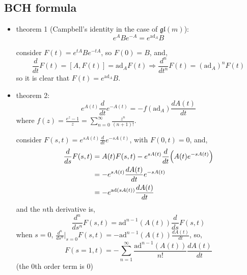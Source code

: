 \subsection{BCH formula}
\begin{itemize}
	\item theorem 1 (Campbell’s identity in the case of $\mathfrak{gl}(m)$):
	\begin{equation}
		e^A B e^{- A} = e^{\mathrm{ad}_A} B
	\end{equation}
	
	\begin{tcolorbox}[title=proof:]
		consider $F(t) = e^{t A} B e^{- t A}$, so $F(0) = B$, and,
		\begin{equation}
			\frac{d}{dt} F(t) = [A, F(t)] = \mathrm{ad}_A F(t) \Longrightarrow \frac{d^n}{dt^n} F(t) = (\mathrm{ad}_A)^n F(t)
		\end{equation}
		so it is clear that $F(t) = e^{\mathrm{ad}_A} B$.
	\end{tcolorbox}
	
	\item theorem 2:
	\begin{equation}
		e^{A(t)} \frac{d}{dt} e^{- A(t)} = - f(\mathrm{ad}_A) \frac{d A(t)}{dt}
	\end{equation}
	where $f(z) = \frac{e^z - 1}{z} = \sum_{n = 0}^\infty \frac{z^n}{(n + 1)!}$.
	
	\begin{tcolorbox}[title=proof:]
		consider $F(s, t) = e^{s A(t)} \frac{d}{dt} e^{- s A(t)}$, with $F(0, t) = 0$, and,
		\begin{align}
			\frac{d}{ds} F(s, t) &= A(t) F(s, t) - e^{s A(t)} \frac{d}{dt} \Big( A(t) e^{- s A(t)} \Big) \notag \\
			&= - e^{s A(t)} \frac{d A(t)}{dt} e^{- s A(t)} \notag \\
			&= - e^{\mathrm{ad}(s A(t))} \frac{d A(t)}{dt}
		\end{align}
		and the $n$th derivative is,
		\begin{equation}
			\frac{d^n}{ds^n} F(s, t) = \mathrm{ad}^{n - 1}(A(t)) \frac{d}{ds} F(s, t)
		\end{equation}
		when $s = 0$, $\frac{d^n}{ds^n} \big|_{s = 0} F(s, t) = - \mathrm{ad}^{n - 1}(A(t)) \frac{d A(t)}{dt}$, so,
		\begin{equation}
			F(s = 1, t) = - \sum_{n = 1}^\infty \frac{\mathrm{ad}^{n - 1}(A(t))}{n!} \frac{d A(t)}{dt}
		\end{equation}
		(the 0th order term is $0$)
	\end{tcolorbox}
	

\end{itemize}
